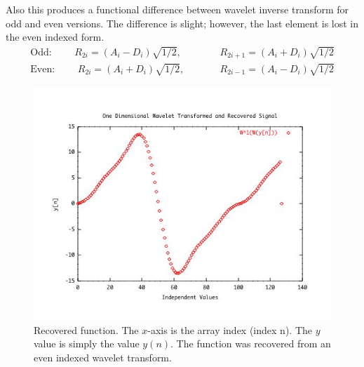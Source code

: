 Also this produces a functional difference between wavelet inverse transform for odd and even versions.  The difference is slight; however, the last element is lost in the even indexed form.  
\begin{eqnarray*}
\mbox{Odd: } \qquad R_{2i} =(A_i - D_i ) \sqrt{1/2}, &\qquad& R_{2i+1}=(A_i + D_i ) \sqrt{1/2} \\
\mbox{Even: } \qquad R_{2i} =(A_i + D_i ) \sqrt{1/2}, &\qquad& R_{2i-1}=(A_i - D_i ) \sqrt{1/2} 
\end{eqnarray*}


\begin{figure}
\begin{center}\includegraphics [width=6in]{recoveredEven.jpg} \end{center}
\caption{Recovered function.  The $x$-axis is the array index (index n).  The $y$ value is simply the value $y(n)$.  The function was recovered from an even indexed wavelet transform. }
\label{recoverEven}
\end{figure}

